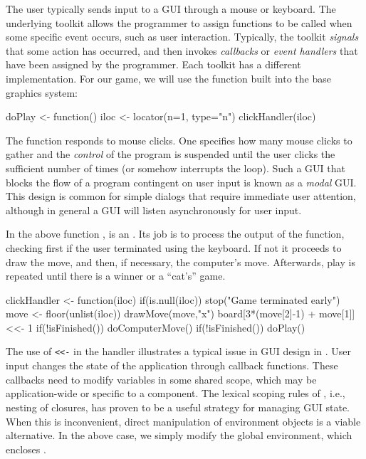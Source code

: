The user typically sends input to a GUI through a mouse or keyboard. 
The underlying toolkit allows the programmer to assign
functions to be called when some specific event occurs, such as user interaction. Typically, the
toolkit \textit{signals} that some action has occurred, and then
invokes \textit{callbacks} or \textit{event handlers} that have been
assigned by the programmer. Each toolkit has a different implementation. 
For our game, we will use the  function built
into the base \R\/ graphics system:
\begin{Schunk}
\begin{Sinput}
 doPlay <- function() {
   iloc <- locator(n=1, type="n")
   clickHandler(iloc)
 }
\end{Sinput}
\end{Schunk}
%
The  function responds to mouse clicks. One specifies
how many mouse clicks to gather and the \textit{control} of the
program is suspended until the user clicks the sufficient number of
times (or somehow interrupts the loop). Such a GUI that blocks the
flow of a program contingent on user input is known as a
\textit{modal} GUI. This design is common for simple dialogs that
require immediate user attention, although in general a GUI will
listen asynchronously for user input.


In the above function ,  is
an . Its job is to process the output of the
 function, checking first if the user terminated
 using the keyboard. If not it proceeds to draw the
move, and then, if necessary, the computer's move. Afterwards, play is
repeated until there is a winner or a ``cat's'' game.


\begin{Schunk}
\begin{Sinput}
 clickHandler <- function(iloc) {
   if(is.null(iloc)) 
     stop("Game terminated early")
   move <- floor(unlist(iloc))
   drawMove(move,"x")
   board[3*(move[2]-1) + move[1]] <<- 1
   if(!isFinished()) 
     doComputerMove()
   if(!isFinished()) 
     doPlay()
 }
\end{Sinput}
\end{Schunk}

The use of \verb+<<-+ in the handler illustrates a typical issue in
GUI design in \R.  User input changes the state of the application
through callback functions. These callbacks need to modify variables
in some shared scope, which may be application-wide or specific to a
component. The lexical scoping rules of \R, i.e., nesting of closures,
has proven to be a useful strategy for managing GUI state. When this
is inconvenient, direct manipulation of environment objects is a
viable alternative. In the above case, we simply modify the global
environment, which encloses .


